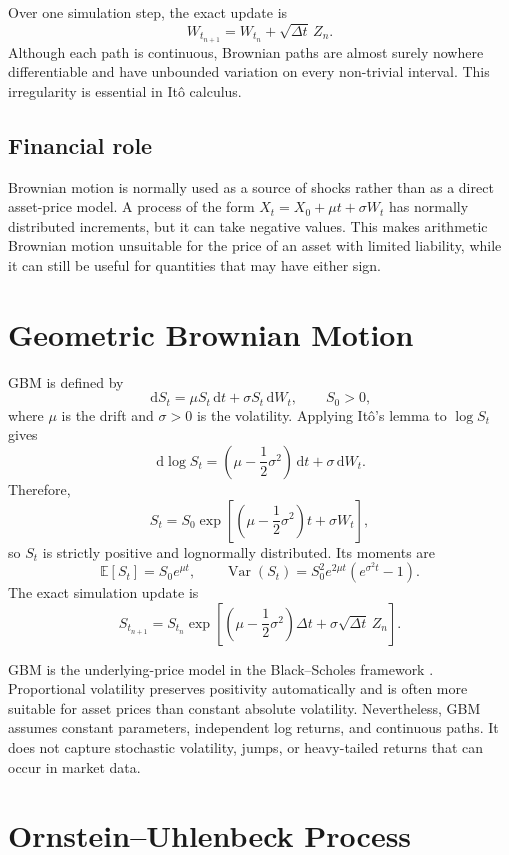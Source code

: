 \documentclass[11pt,a4paper]{article}
\newcommand{\E}{\mathbb{E}}
\newcommand{\Var}{\operatorname{Var}}
\newcommand{\dd}{\,\mathrm{d}}
\begin{document}
Over one simulation step, the exact update is
\[
  W_{t_{n+1}}=W_{t_n}+\sqrt{\Delta t}\,Z_n.
\]
Although each path is continuous, Brownian paths are almost surely nowhere differentiable and have unbounded variation on every non-trivial interval. This irregularity is essential in It\^o calculus.

\subsection{Financial role}

Brownian motion is normally used as a source of shocks rather than as a direct asset-price model. A process of the form $X_t=X_0+\mu t+\sigma W_t$ has normally distributed increments, but it can take negative values. This makes arithmetic Brownian motion unsuitable for the price of an asset with limited liability, while it can still be useful for quantities that may have either sign.

\section{Geometric Brownian Motion}

GBM is defined by
\[
  \dd S_t=\mu S_t\dd t+\sigma S_t\dd W_t, \qquad S_0>0,
\]
where $\mu$ is the drift and $\sigma>0$ is the volatility. Applying It\^o's lemma to $\log S_t$ gives
\[
  \dd\log S_t=\left(\mu-\frac{1}{2}\sigma^2\right)\dd t+\sigma\dd W_t.
\]
Therefore,
\[
  S_t=S_0\exp\left[\left(\mu-\frac{1}{2}\sigma^2\right)t+\sigma W_t\right],
\]
so $S_t$ is strictly positive and lognormally distributed. Its moments are
\[
  \E[S_t]=S_0e^{\mu t}, \qquad
  \Var(S_t)=S_0^2e^{2\mu t}\left(e^{\sigma^2t}-1\right).
\]
The exact simulation update is
\[
  S_{t_{n+1}}=S_{t_n}\exp\left[\left(\mu-\frac{1}{2}\sigma^2\right)\Delta t
  +\sigma\sqrt{\Delta t}\,Z_n\right].
\]

GBM is the underlying-price model in the Black--Scholes framework \cite{shreve,hull}. Proportional volatility preserves positivity automatically and is often more suitable for asset prices than constant absolute volatility. Nevertheless, GBM assumes constant parameters, independent log returns, and continuous paths. It does not capture stochastic volatility, jumps, or heavy-tailed returns that can occur in market data.

\section{Ornstein--Uhlenbeck Process}
\end{document}
